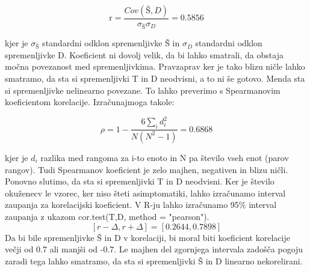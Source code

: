 \documentclass[a4paper,11pt]{article}
\begin{document}
\begin{center}
\[\text{r} = \frac{Cov(Š,D)}{\sigma_{Š} \sigma_{D}} = 0.5856\]
\end{center} 
kjer je \(\sigma_{Š}\) standardni odklon spremenljivke Š in \(\sigma_{D}\) standardni odklon spremenljivke D. Koeficient ni dovolj velik, da bi lahko smatrali, da obstaja močna povezanost med spremenljivkima. Pravzaprav ker je tako blizu ničle lahko smatramo, da sta si spremenljivki T in D neodvisni, a to ni še gotovo. Menda sta si spremenljivke nelinearno povezane. To lahko preverimo s Spearmanovim koeficientom korelacije. Izračunajmoga takole: 

\begin{center}
\[\rho = 1 - \frac{6\sum_{i}{}d_i^2}{N(N^2 - 1)} = 0.6868\]
\end{center} 

kjer je \( d_i \) razlika med rangoma za i-to enoto in N pa število vseh enot (parov rangov). Tudi Spearmanov koeficient je zelo majhen, negativen in blizu ničli. Ponovno slutimo, da sta si spremenljivki T in D neodvisni.
Ker je število okuženecv le vzorec, ker niso šteti asimptomatiki, lahko izračunamo interval zaupanja za korelacijski koeficient. V R-ju lahko izračunamo 95\% interval zaupanja z ukazom cor.test(T,D, method = "pearson").
\[[r - \Delta, r + \Delta] = [0.2644, 0.7898]\]
Da bi bile spremenljivke Š in D v korelaciji, bi moral biti koeficient korelacije večji od 0.7 ali manjši od -0.7. Le majhen del zgornjega intervala zadošča pogoju zaradi tega lahko smatramo, da sta si spremenljivki Š in D linearno nekorelirani.
\end{document}
